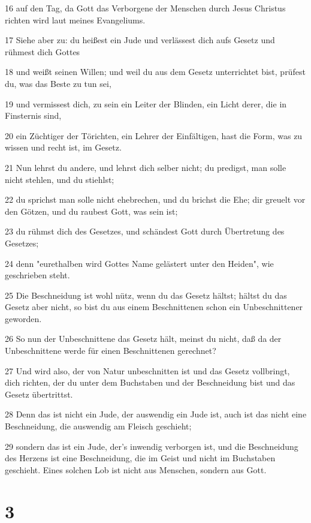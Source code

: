 \par 16 auf den Tag, da Gott das Verborgene der Menschen durch Jesus Christus richten wird laut meines Evangeliums.
\par 17 Siehe aber zu: du heißest ein Jude und verlässest dich aufs Gesetz und rühmest dich Gottes
\par 18 und weißt seinen Willen; und weil du aus dem Gesetz unterrichtet bist, prüfest du, was das Beste zu tun sei,
\par 19 und vermissest dich, zu sein ein Leiter der Blinden, ein Licht derer, die in Finsternis sind,
\par 20 ein Züchtiger der Törichten, ein Lehrer der Einfältigen, hast die Form, was zu wissen und recht ist, im Gesetz.
\par 21 Nun lehrst du andere, und lehrst dich selber nicht; du predigst, man solle nicht stehlen, und du stiehlst;
\par 22 du sprichst man solle nicht ehebrechen, und du brichst die Ehe; dir greuelt vor den Götzen, und du raubest Gott, was sein ist;
\par 23 du rühmst dich des Gesetzes, und schändest Gott durch Übertretung des Gesetzes;
\par 24 denn "eurethalben wird Gottes Name gelästert unter den Heiden", wie geschrieben steht.
\par 25 Die Beschneidung ist wohl nütz, wenn du das Gesetz hältst; hältst du das Gesetz aber nicht, so bist du aus einem Beschnittenen schon ein Unbeschnittener geworden.
\par 26 So nun der Unbeschnittene das Gesetz hält, meinst du nicht, daß da der Unbeschnittene werde für einen Beschnittenen gerechnet?
\par 27 Und wird also, der von Natur unbeschnitten ist und das Gesetz vollbringt, dich richten, der du unter dem Buchstaben und der Beschneidung bist und das Gesetz übertrittst.
\par 28 Denn das ist nicht ein Jude, der auswendig ein Jude ist, auch ist das nicht eine Beschneidung, die auswendig am Fleisch geschieht;
\par 29 sondern das ist ein Jude, der's inwendig verborgen ist, und die Beschneidung des Herzens ist eine Beschneidung, die im Geist und nicht im Buchstaben geschieht. Eines solchen Lob ist nicht aus Menschen, sondern aus Gott.

\chapter{3}

